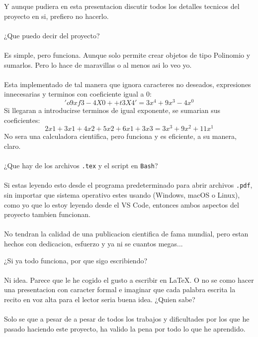 \documentclass{article}
\begin{document}
Y aunque pudiera en esta presentacion discutir todos los detalles tecnicos del proyecto en si, prefiero no hacerlo.\\\\
¿Que puedo decir del proyecto?\\\\
Es simple, pero funciona. Aunque solo permite crear objetos de tipo Polinomio y sumarlos. Pero lo hace de maravillas o al menos asi lo veo yo.\\\\
Esta implementado de tal manera que ignora caracteres no deseados, expresiones innecesarias y terminos con coeficiente igual a 0:
\begin{equation}
    'o9xf3-4X0 ++t3X4' = 3x^4 + 9x^3 - 4x^0
\end{equation}
Si llegaran a introducirse terminos de igual exponente, se sumarian sus coeficientes:
\begin{equation}
    2x1+3x1+4x2+5x2+6x1+3x3 = 3x^3 + 9x^2 + 11x^1
\end{equation}
No sera una calculadora cientifica, pero funciona y es eficiente, a su manera, claro.\\\\
¿Que hay de los archivos \verb|.tex| y  el script en \verb|Bash|?\\\\
Si estas leyendo esto desde el programa predeterminado para abrir archivos \verb|.pdf|, sin importar que sistema operativo estes usando (Windows, macOS o Linux), como yo que lo estoy leyendo desde el VS Code, entonces ambos aspectos del proyecto tambien funcionan.\\\\
No tendran la calidad de una publicacion cientifica de fama mundial, pero estan hechos con dedicacion, esfuerzo y ya ni se cuantos megas...\\

\newpage

¿Si ya todo funciona, por que sigo escribiendo?\\\\
Ni idea. Parece que le he cogido el gusto a escribir en \LaTeX. O no se como hacer una presentacion con caracter formal e imaginar que cada palabra escrita la recito en voz alta para el lector seria buena idea. ¿Quien sabe?\\\\
Solo se que a pesar de a pesar de todos los trabajos y dificultades por los que he pasado haciendo este proyecto, ha valido la pena por todo lo que he aprendido.\\\\
\end{document}
